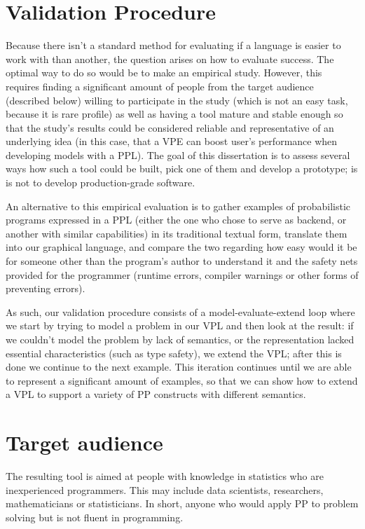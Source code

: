 \section{Validation Procedure}

Because there isn't a standard method for evaluating if a language is easier
to work with than another, the question arises on how to evaluate success.
The optimal way to do so would be to make an empirical
study. However, this requires finding a significant amount of people from the
target audience (described below) willing to participate in the study (which
is not an easy task, because it is rare profile) as well as having a tool mature and stable enough so that the
study's results could be considered reliable and representative of an underlying
idea (in this case, that a VPE can boost user's performance when developing
models with a PPL). The goal of this dissertation is to
assess several ways how such a tool could be built, pick one of them and develop
a prototype; is is not to develop production-grade software.

An alternative to this empirical evaluation is to gather examples of probabilistic programs expressed in a
PPL (either the one who chose to serve as backend, or another with similar
capabilities) in its traditional textual form, translate them into our graphical
language, and compare the two regarding how easy would it be for someone other than
the program's author to understand it and the safety nets provided for the programmer
(runtime errors, compiler warnings or other forms of preventing errors).

As such, our validation procedure consists of a model-evaluate-extend loop where
we start by trying to model a problem in our VPL and then look at the result:
if we couldn't model the problem by lack of semantics, or the representation
lacked essential characteristics (such as type safety), we extend the VPL;
after this is done we continue to the next example. This iteration continues
until we are able to represent a significant amount of examples, so that
we can show how to extend a VPL to support a variety of PP constructs with different
semantics.

\section{Target audience}\label{sec:audience}

The resulting tool is aimed at people with knowledge in statistics
who are inexperienced programmers. This may include data scientists, researchers,
mathematicians or statisticians. In short, anyone who would apply PP to problem
solving but is not fluent in programming.

